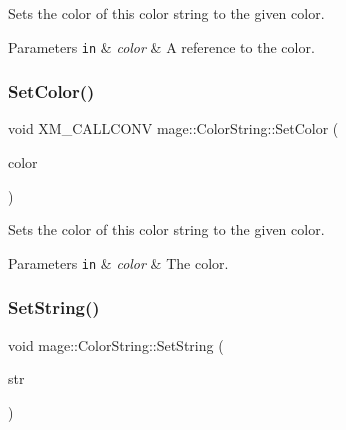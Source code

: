 Sets the color of this color string to the given color.


\begin{DoxyParams}[1]{Parameters}
\mbox{\tt in}  & {\em color} & A reference to the color. \\
\hline
\end{DoxyParams}
\hypertarget{structmage_1_1_color_string_ab4de02b485d18384fcca1a0b55600abd}{}\label{structmage_1_1_color_string_ab4de02b485d18384fcca1a0b55600abd} 
\subsubsection{\texorpdfstring{Set\+Color()}{SetColor()}\hspace{0.1cm}{\footnotesize\ttfamily [3/3]}}
{\footnotesize\ttfamily void X\+M\+\_\+\+C\+A\+L\+L\+C\+O\+NV mage\+::\+Color\+String\+::\+Set\+Color (\begin{DoxyParamCaption}\item[{F\+X\+M\+V\+E\+C\+T\+OR}]{color }\end{DoxyParamCaption})\hspace{0.3cm}{\ttfamily [noexcept]}}

Sets the color of this color string to the given color.


\begin{DoxyParams}[1]{Parameters}
\mbox{\tt in}  & {\em color} & The color. \\
\hline
\end{DoxyParams}
\hypertarget{structmage_1_1_color_string_aa5ec8bb8e44683ed8a88534f04639930}{}\label{structmage_1_1_color_string_aa5ec8bb8e44683ed8a88534f04639930} 
\subsubsection{\texorpdfstring{Set\+String()}{SetString()}\hspace{0.1cm}{\footnotesize\ttfamily [1/3]}}
{\footnotesize\ttfamily void mage\+::\+Color\+String\+::\+Set\+String (\begin{DoxyParamCaption}\item[{const wstring \&}]{str }\end{DoxyParamCaption})}

